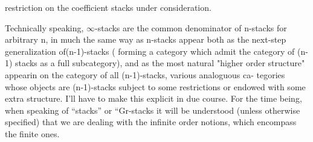 restriction on the coefficient stacks under consideration.

 Technically speaking, $\infty$-stacks are the
common denominator of n-stacks for arbitrary n, in much the same way as
n-stacks appear both as the next-step generalization of(n-1)-stacks
( forming a category which admit the category of (n-1) stacks as a full
subcategory), and as the most natural "higher order structure" appearin
on the category of all  (n-1)-stacks, \hand{(}  various analoguous ca-
tegories whose objects are (n-1)-stacks subject to some restrictions or
endowed with some extra structure\hand{)}. I'll have to make this explicit in
due course. For the time being, when speaking of ``stacks'' or ``Gr-stacks
it will be understood (unless otherwise specified) that we are dealing
with the infinite order notions, which encompass the finite ones.

